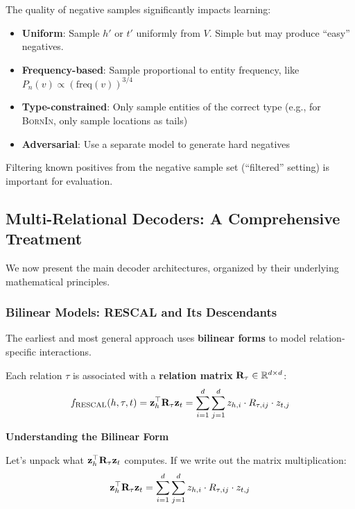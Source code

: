 \begin{notechapter}
\begin{remark}
The quality of negative samples significantly impacts learning:
\begin{itemize}
    \item \textbf{Uniform}: Sample $h'$ or $t'$ uniformly from $V$. Simple but may produce ``easy'' negatives.
    \item \textbf{Frequency-based}: Sample proportional to entity frequency, like $P_n(v) \propto (\text{freq}(v))^{3/4}$
    \item \textbf{Type-constrained}: Only sample entities of the correct type (e.g., for \textsc{BornIn}, only sample locations as tails)
    \item \textbf{Adversarial}: Use a separate model to generate hard negatives
\end{itemize}
Filtering known positives from the negative sample set (``filtered'' setting) is important for evaluation.
\end{remark}


\subsection{Multi-Relational Decoders: A Comprehensive Treatment}

We now present the main decoder architectures, organized by their underlying mathematical principles.

\subsubsection{Bilinear Models: RESCAL and Its Descendants}

The earliest and most general approach uses \textbf{bilinear forms} to model relation-specific interactions.

\begin{definition}
Each relation $\tau$ is associated with a \textbf{relation matrix} $\mathbf{R}_\tau \in \mathbb{R}^{d \times d}$:
\begin{equation}
f_{\text{RESCAL}}(h, \tau, t) = \mathbf{z}_h^\top \mathbf{R}_\tau \mathbf{z}_t = \sum_{i=1}^{d} \sum_{j=1}^{d} z_{h,i} \cdot R_{\tau,ij} \cdot z_{t,j}
\end{equation}
\end{definition}

\begin{mathbox}
\textbf{Understanding the Bilinear Form}

Let's unpack what $\mathbf{z}_h^\top \mathbf{R}_\tau \mathbf{z}_t$ computes. If we write out the matrix multiplication:
\[
\mathbf{z}_h^\top \mathbf{R}_\tau \mathbf{z}_t = \sum_{i=1}^{d} \sum_{j=1}^{d} z_{h,i} \cdot R_{\tau,ij} \cdot z_{t,j}
\]


\end{mathbox}
\end{notechapter}
